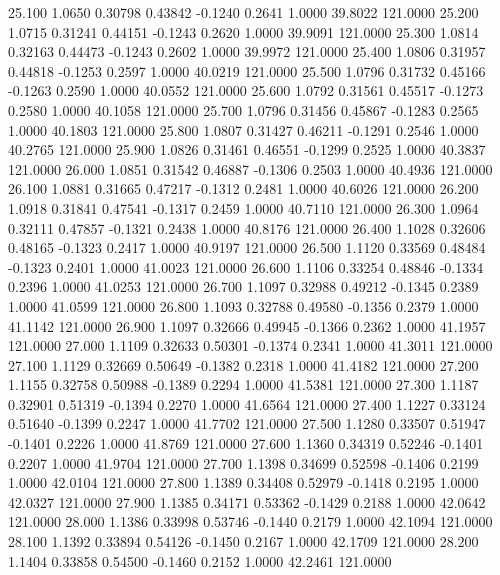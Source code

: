   25.100   1.0650   0.30798   0.43842  -0.1240   0.2641   1.0000  39.8022 121.0000
  25.200   1.0715   0.31241   0.44151  -0.1243   0.2620   1.0000  39.9091 121.0000
  25.300   1.0814   0.32163   0.44473  -0.1243   0.2602   1.0000  39.9972 121.0000
  25.400   1.0806   0.31957   0.44818  -0.1253   0.2597   1.0000  40.0219 121.0000
  25.500   1.0796   0.31732   0.45166  -0.1263   0.2590   1.0000  40.0552 121.0000
  25.600   1.0792   0.31561   0.45517  -0.1273   0.2580   1.0000  40.1058 121.0000
  25.700   1.0796   0.31456   0.45867  -0.1283   0.2565   1.0000  40.1803 121.0000
  25.800   1.0807   0.31427   0.46211  -0.1291   0.2546   1.0000  40.2765 121.0000
  25.900   1.0826   0.31461   0.46551  -0.1299   0.2525   1.0000  40.3837 121.0000
  26.000   1.0851   0.31542   0.46887  -0.1306   0.2503   1.0000  40.4936 121.0000
  26.100   1.0881   0.31665   0.47217  -0.1312   0.2481   1.0000  40.6026 121.0000
  26.200   1.0918   0.31841   0.47541  -0.1317   0.2459   1.0000  40.7110 121.0000
  26.300   1.0964   0.32111   0.47857  -0.1321   0.2438   1.0000  40.8176 121.0000
  26.400   1.1028   0.32606   0.48165  -0.1323   0.2417   1.0000  40.9197 121.0000
  26.500   1.1120   0.33569   0.48484  -0.1323   0.2401   1.0000  41.0023 121.0000
  26.600   1.1106   0.33254   0.48846  -0.1334   0.2396   1.0000  41.0253 121.0000
  26.700   1.1097   0.32988   0.49212  -0.1345   0.2389   1.0000  41.0599 121.0000
  26.800   1.1093   0.32788   0.49580  -0.1356   0.2379   1.0000  41.1142 121.0000
  26.900   1.1097   0.32666   0.49945  -0.1366   0.2362   1.0000  41.1957 121.0000
  27.000   1.1109   0.32633   0.50301  -0.1374   0.2341   1.0000  41.3011 121.0000
  27.100   1.1129   0.32669   0.50649  -0.1382   0.2318   1.0000  41.4182 121.0000
  27.200   1.1155   0.32758   0.50988  -0.1389   0.2294   1.0000  41.5381 121.0000
  27.300   1.1187   0.32901   0.51319  -0.1394   0.2270   1.0000  41.6564 121.0000
  27.400   1.1227   0.33124   0.51640  -0.1399   0.2247   1.0000  41.7702 121.0000
  27.500   1.1280   0.33507   0.51947  -0.1401   0.2226   1.0000  41.8769 121.0000
  27.600   1.1360   0.34319   0.52246  -0.1401   0.2207   1.0000  41.9704 121.0000
  27.700   1.1398   0.34699   0.52598  -0.1406   0.2199   1.0000  42.0104 121.0000
  27.800   1.1389   0.34408   0.52979  -0.1418   0.2195   1.0000  42.0327 121.0000
  27.900   1.1385   0.34171   0.53362  -0.1429   0.2188   1.0000  42.0642 121.0000
  28.000   1.1386   0.33998   0.53746  -0.1440   0.2179   1.0000  42.1094 121.0000
  28.100   1.1392   0.33894   0.54126  -0.1450   0.2167   1.0000  42.1709 121.0000
  28.200   1.1404   0.33858   0.54500  -0.1460   0.2152   1.0000  42.2461 121.0000
